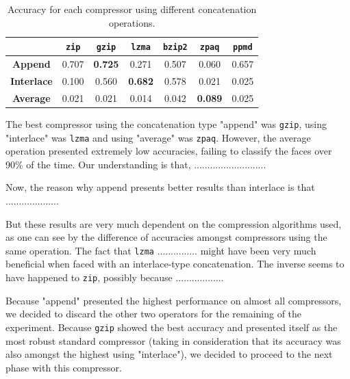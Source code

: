 \documentclass[12pt]{article}
\begin{document}
\begin{table}[h!]
\centering
\begin{tabular}{@{}c|cccccc@{}}
                   & \textbf{\texttt{zip}} & \textbf{\texttt{gzip}} & \textbf{\texttt{lzma}} & \textbf{\texttt{bzip2}} & \textbf{\texttt{zpaq}} & \textbf{\texttt{ppmd}}\\ \midrule
\textbf{Append}    & 0.707     & \textbf{0.725}   & 0.271           & 0.507     & 0.060           & 0.657 \\
\textbf{Interlace} & 0.100     & 0.560            & \textbf{0.682}  & 0.578     & 0.021           & 0.025 \\ 
\textbf{Average}   & 0.021     & 0.021            & 0.014           & 0.042     & \textbf{0.089}  & 0.025 \\ 
\end{tabular}
\vspace{5pt}
\caption{Accuracy for each compressor using different concatenation operations.}
\label{tab:1}
\end{table}

The best compressor using the concatenation type "append" was \texttt{gzip}, using "interlace" was \texttt{lzma} and using "average" was \texttt{zpaq}.
However, the average operation presented extremely low accuracies, failing to classify the faces over 90\% of the time.
Our understanding is that, ...........................

Now, the reason why append presents better results than interlace is that ....................

But these results are very much dependent on the compression algorithms used, as one can see by the difference of accuracies amongst compressors using the same operation.
The fact that \texttt{lzma} ............... might have been very much beneficial when faced with an interlace-type concatenation.
The inverse seems to have happened to \texttt{zip}, possibly because ..................

Because "append" presented the highest performance on almost all compressors, we decided to discard the other two operators for the remaining of the experiment.
Because \texttt{gzip} showed the best accuracy and presented itself as the most robust standard compressor (taking in consideration that its accuracy was also
amongst the highest using "interlace"), we decided to proceed to the next phase with this compressor.
\newline 
\end{document}
